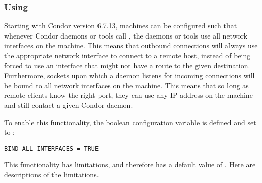 \subsubsection{\label{sec:Using-BindAllInterfaces}Using 
}

Starting with Condor version 6.7.13, machines can be configured such that
whenever Condor daemons or tools
call , the daemons or tools use all network interfaces on
the machine.
This means that outbound connections will always use the appropriate
network interface to connect to a remote host,
instead of being forced to use
an interface that might not have a route to the given destination.
Furthermore, sockets upon which a daemon listens for incoming connections 
will be bound to all network interfaces on the machine.
This means that so long as remote clients know the right port, they can
use any IP address on the machine and still contact a given Condor daemon.

To enable this functionality, the boolean configuration
variable
is defined and set to :

\begin{verbatim}
BIND_ALL_INTERFACES = TRUE
\end{verbatim}

This functionality has limitations,
and therefore has a default value of .
Here are descriptions of the limitations.

